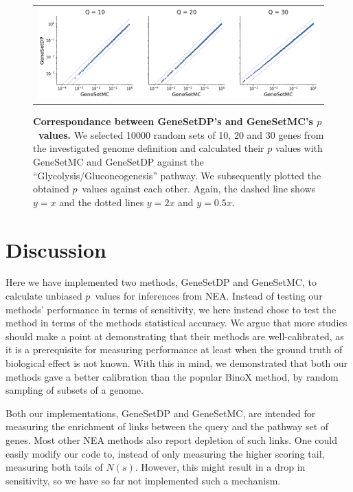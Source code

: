 \documentclass[10pt,letterpaper]{article}
\begin{document}
\begin{figure}[htb]
  \begin{center}
		  \begin{tabular}[t]{c}
				\includegraphics[width=1.0\textwidth]{figures/scatter_dp_mc.png}
		\end{tabular}
  \end{center}
  \caption{{\bf Correspondance between GeneSetDP's and GeneSetMC's $p$~values.} We selected 10000 random sets of 10, 20 and 30 genes from the investigated genome definition and calculated their $p$ values with GeneSetMC and GeneSetDP against the ``Glycolysis/Gluconeogenesis'' pathway. We subsequently plotted the obtained $p$~values against each other. Again, the dashed line shows $y = x$ and the dotted lines $y = 2x$ and $y = 0.5x$.}
  \label{fig:pscatter}
\end{figure}

\section*{Discussion}

Here we have implemented two methods, GeneSetDP and GeneSetMC, to calculate unbiased $p$~values for inferences from NEA.
Instead of testing our methods' performance in terms of sensitivity, we here instead chose to test the method in terms of the methods statistical accuracy. We argue that more studies should make a point at demonstrating that their methods are well-calibrated, as it is a prerequisite for measuring performance at least when the ground truth of biological effect is not known.
With this in mind, we demonstrated that both our methods gave a better calibration than the popular BinoX method, by random sampling of subsets of a genome.

Both our implementations, GeneSetDP and GeneSetMC, are intended for measuring the enrichment of links between the query and the pathway set of genes. Most other NEA methods also report depletion of such links. One could easily modify our code to, instead of only measuring the higher scoring tail, measuring both tails of $N(s)$. However, this might result in a drop in sensitivity, so we have so far not implemented such a mechanism.
\end{document}
